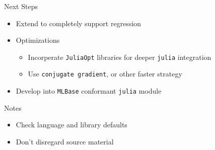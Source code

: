 \documentclass[10pt]{beamer}
\begin{document}
\begin{frame}{Next Steps}
  \begin{itemize}
  \item Extend to completely support regression
  \item Optimizations
    \begin{itemize}
    \item Incorperate \texttt{JuliaOpt} libraries for deeper \texttt{julia} integration
    \item Use \texttt{conjugate gradient}, or other faster strategy
    \end{itemize}
  \item Develop into \texttt{MLBase} conformant \texttt{julia} module
  \end{itemize}
\end{frame}

\begin{frame}{Notes}
  \begin{itemize}
  \item Check language and library defaults
  \item Don't disregard source material
  \end{itemize}
\end{frame}
\end{document}
